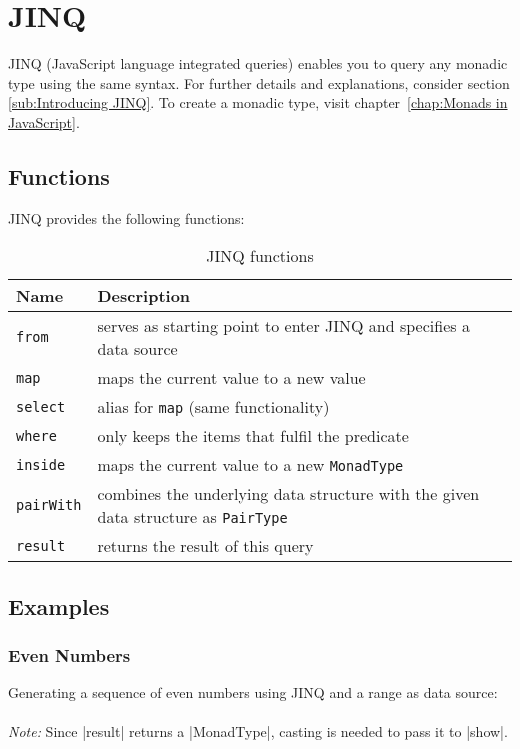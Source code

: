 \section{JINQ} %
\label{sec:API_JINQ}
JINQ (JavaScript language integrated queries) enables you to query any monadic
type using the same syntax.
\newline
For further details and explanations, consider section \ref{sub:Introducing JINQ}.
\newline
To create a monadic type, visit chapter~\ref{chap:Monads in JavaScript}.

\subsection{Functions}
\label{sub:JINQ_Functions}
JINQ provides the following functions:

\begin{table}[H]
  \centering
  \begin{tabularx}{\textwidth}{| l | X |} \hline
    \textbf{Name}       & \textbf{Description} \\ \hline
    \texttt{from}       & serves as starting point to enter JINQ and specifies a data source \\ \hline 
    \texttt{map}        & maps the current value to a new value \\ \hline 
    \texttt{select}     & alias for \texttt{map} (same functionality) \\ \hline 
    \texttt{where}      & only keeps the items that fulfil the predicate \\ \hline
    \texttt{inside}     & maps the current value to a new \texttt{MonadType} \\ \hline 
    \texttt{pairWith}   & combines the underlying data structure with the given data structure as \texttt{PairType} \\ \hline 
    \texttt{result}     & returns the result of this query\\ \hline 

  \end{tabularx}
  \caption{JINQ functions}
  \label{tab:jinq_functions}
\end{table}

\subsection{Examples}
\label{sub:JINQ_Examples}

\subsubsection{Even Numbers}
\label{subsub:JINQ_Even Numbers}
Generating a sequence of even numbers using JINQ and a range as data source:\\
\\
\textit{Note:} Since |result| returns a |MonadType|, casting is needed
to pass it to |show|.

